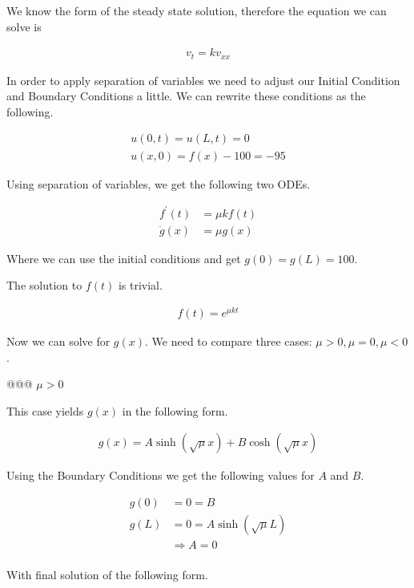 \documentclass[10pt]{article}
\begin{document}
\begin{easylist}[enumerate]
    We know the form of the steady state solution, therefore the equation we can solve is 

    \begin{align*}
        v_t = kv_{xx}
    \end{align*}

    In order to apply separation of variables we need to adjust our Initial Condition and Boundary Conditions a little.
    We can rewrite these conditions as the following.

    \begin{align*}
        u(0, t) = u(L, t) = 0\\
        u(x, 0) = f(x) - 100 = -95
    \end{align*}

    Using separation of variables, we get the following two ODEs.

    \begin{align*}
        f^\prime(t) &= \mu k f(t)\\
        \ddot{g}(x) &= \mu g(x)
    \end{align*}

    Where we can use the initial conditions and get $g(0) = g(L) = 100$.

    The solution to $f(t)$ is trivial.

    \begin{align*}
        f(t) = e^{\mu k t}
    \end{align*}

    Now we can solve for $g(x)$. We need to compare three cases: $\mu > 0, \mu = 0, \mu < 0$.

    @@@ $\mu > 0$

    This case yields $g(x)$ in the following form.

    \begin{align*}
        g(x) = A \sinh\left(\sqrt{\mu}x\right) + B \cosh\left(\sqrt{\mu} x\right)
    \end{align*}

    Using the Boundary Conditions we get the following values for $A$ and $B$.

    \begin{align*}
        g(0) &= 0 = B\\
        g(L) &= 0 = A \sinh\left(\sqrt{\mu}L\right)\\
        &\Rightarrow A = 0\\
    \end{align*}

    With final solution of the following form.


\end{easylist}
\end{document}
